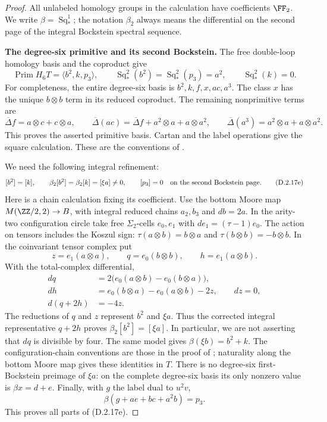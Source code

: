 \begin{proof}
All unlabeled homology groups in the calculation have coefficients
$\FF_2$. We write $\beta=\operatorname{Sq}_*^1$; the notation
$\beta_2$ always means the differential on the second page of the
integral Bockstein spectral sequence.

\medskip\noindent
\textbf{The degree-six primitive and its second Bockstein.}
The free double-loop homology basis and the coproduct give
\[
 \operatorname{Prim}H_6T=\langle b^2,k,p_3\rangle,
 \qquad
 \operatorname{Sq}_*^2(b^2)=\operatorname{Sq}_*^2(p_3)=a^2,
 \qquad \operatorname{Sq}_*^2(k)=0.
 \tag{D.2.17d}
\]
For completeness, the entire degree-six basis is
$b^2,k,f,x,ac,a^3$. The class $x$ has the unique $b\otimes b$
term in its reduced coproduct. The remaining nonprimitive terms are
\[
 \overline\Delta f=a\otimes c+c\otimes a,
 \qquad
 \overline\Delta(ac)=\overline\Delta f+a^2\otimes a+a\otimes a^2,
 \qquad
 \overline\Delta(a^3)=a^2\otimes a+a\otimes a^2.
\]
This proves the asserted primitive basis. Cartan and the label
operations give the square calculation. These are the conventions
of \cite[Chapter~III, Theorems~1.2--1.4 and 3.1--3.2]{I_CohenLadaMay1976}.

We need the following integral refinement:
\[
 [b^2]=[k],\qquad
 \beta_2[b^2]=\beta_2[k]=[\xi a]\ne0,
 \qquad [p_3]=0
 \quad\hbox{on the second Bockstein page.}
 \tag{D.2.17e}
\]
Here is a chain calculation fixing its coefficient. Use the bottom
Moore map $M(\ZZ/2,2)\to B$, with integral reduced chains $a_2,b_3$
and $db=2a$. In the arity-two configuration circle take free
$\Sigma_2$-cells $e_0,e_1$ with $de_1=(\tau-1)e_0$.
The action on tensors includes the Koszul sign:
$\tau(a\otimes b)=b\otimes a$ and
$\tau(b\otimes b)=-b\otimes b$. In the coinvariant tensor complex put
\[
 z=e_1(a\otimes a),\qquad
 q=e_0(b\otimes b),\qquad h=e_1(a\otimes b).
\]
With the total-complex differential,
\[
\begin{split}
 dq&=2\bigl(e_0(a\otimes b)-e_0(b\otimes a)\bigr),\\
 dh&=e_0(b\otimes a)-e_0(a\otimes b)-2z,\qquad dz=0,\\
 d(q+2h)&=-4z.
\end{split}
 \tag{D.2.17f}
\]
The reductions of $q$ and $z$ represent $b^2$ and $\xi a$.
Thus the corrected integral representative $q+2h$ proves
$\beta_2[b^2]=[\xi a]$. In particular, we are not asserting that
$dq$ is divisible by four. The same model gives
$\beta(\xi b)=b^2+k$. The configuration-chain conventions are those
in the proof of \cite[Chapter~III, Lemma~3.10, p.~232]{I_CohenLadaMay1976};
naturality along the bottom Moore map gives these identities in $T$.
There is no degree-six first-Bockstein preimage of $\xi a$:
on the complete degree-six basis its only nonzero value is
$\beta x=d+e$. Finally, with $g$ the label dual to $u^2v$,
\[
 \beta(g+ae+bc+a^2b)=p_3.
\]
This proves all parts of \textup{(D.2.17e)}.


\end{proof}
